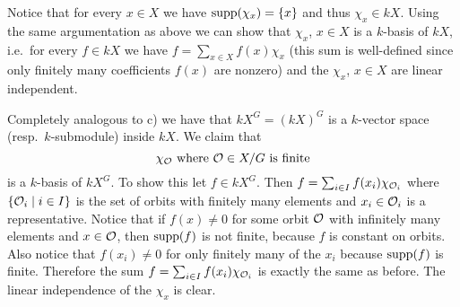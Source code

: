 Notice that for every $x \in X$ we have $\operatorname{supp}(\chi_x) = \{x\}$ and thus $\chi_x \in kX$.
Using the same argumentation as above we can show that $\chi_x$, $x \in X$ is a $k$-basis of $kX$, i.e.\ for every $f \in kX$ we have $f = \sum_{x \in X} f(x) \chi_x$ (this sum is well-defined since only finitely many coefficients $f(x)$ are nonzero) and the $\chi_x$, $x \in X$ are linear independent.

Completely analogous to c) we have that $kX^G = (kX)^G$ is a $k$-vector space (resp.\ $k$-submodule) inside $kX$.
We claim that
\[
  \chi_\mathcal{O}
  \text{ where }
  \mathcal{O} \in X/G \text{ is finite}
\]
is a $k$-basis of $kX^G$.
To show this let $f \in kX^G$.
Then $f = \sum_{i \in I} f(x_i) \chi_{\mathcal{O}_i}$ where $\{\mathcal{O}_i \mid i \in I\}$ is the set of orbits with finitely many elements and $x_i \in \mathcal{O}_i$ is a representative.
Notice that if $f(x) \neq 0$ for some orbit $\mathcal{O}$ with infinitely many elements and $x \in \mathcal{O}$, then $\operatorname{supp}(f)$ is not finite, because $f$ is constant on orbits.
Also notice that $f(x_i) \neq 0$ for only finitely many of the $x_i$ because $\operatorname{supp}(f)$ is finite.
Therefore the sum $f = \sum_{i \in I} f(x_i) \chi_{\mathcal{O}_i}$ is exactly the same as before.
The linear independence of the $\chi_x$ is clear.


